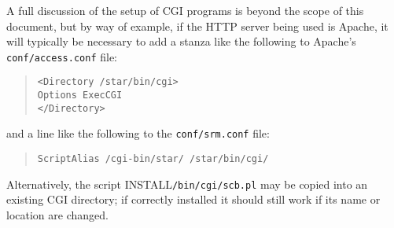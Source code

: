 \documentclass[twoside,11pt]{article}
\newcommand{\htmladdnormallink}[2]{#1}
\renewcommand{\_}{\texttt{\symbol{95}}}
\begin{document}
A full discussion of the setup of CGI programs is
beyond the scope of this document, but by way of example, 
if the HTTP server being used is 
\htmladdnormallink{Apache}{http://www.apache.org/}, 
it will typically 
be necessary to
add a stanza like the following to Apache's {\tt conf/access.conf} file:
\begin{quote}
\begin{verbatim}
<Directory /star/bin/cgi>
Options ExecCGI
</Directory>
\end{verbatim}
\end{quote}
and a line like the following to the {\tt conf/srm.conf} file:
\begin{quote}
\begin{verbatim}
ScriptAlias /cgi-bin/star/ /star/bin/cgi/
\end{verbatim}
\end{quote}
Alternatively, the script INSTALL{\tt /bin/cgi/scb.pl} may be copied 
into an existing CGI directory;
if correctly installed it should still work if its name or location 
are changed.
\end{document}
